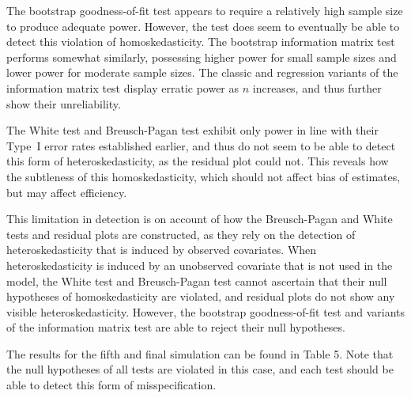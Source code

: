 \documentclass[sn-mathphys-ay]{sn-jnl}
\begin{document}
The bootstrap goodness-of-fit test appears to require a relatively high sample size to produce adequate power. However, the test does seem to eventually be able to detect this violation of homoskedasticity.
The bootstrap information matrix test performs somewhat similarly, possessing higher power for small sample sizes and lower power for moderate sample sizes. The classic and regression variants of the information
matrix test display erratic power as $n$ increases, and thus further show their unreliability.

The White test and Breusch-Pagan test exhibit only power in line with their Type~I error rates established earlier, and thus do not seem to be able to detect this form of heteroskedasticity,
as the residual plot could not. This reveals how the subtleness of this homoskedasticity, which should not affect bias of estimates, but may affect efficiency.

This limitation in detection is on account of how the Breusch-Pagan and White tests and residual plots are constructed, as they rely on the detection of heteroskedasticity that is induced by observed covariates.
When heteroskedasticity is induced by an unobserved covariate that is not used in the model, the White test and Breusch-Pagan test cannot ascertain that their
null hypotheses of homoskedasticity are violated, and residual plots do not show any visible heteroskedasticity. However, the bootstrap goodness-of-fit test and variants of the information matrix test are able to
reject their null hypotheses.

The results for the fifth and final simulation can be found in Table 5. Note that the null hypotheses of all tests are violated in this case, and each test should be able to detect this form of misspecification.

\end{document}
